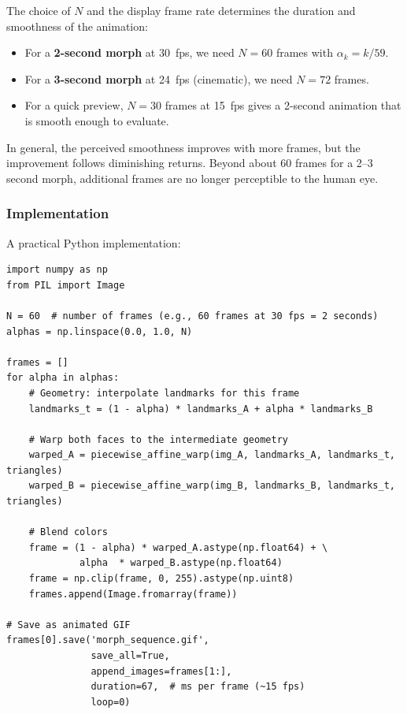 The choice of $N$ and the display frame rate determines the duration and smoothness of the
animation:

\begin{itemize}
    \item For a \textbf{2-second morph} at 30~fps, we need $N = 60$ frames with
          $\alpha_k = k / 59$.
    \item For a \textbf{3-second morph} at 24~fps (cinematic), we need $N = 72$ frames.
    \item For a quick preview, $N = 30$ frames at 15~fps gives a 2-second animation that
          is smooth enough to evaluate.
\end{itemize}

In general, the perceived smoothness improves with more frames, but the improvement follows
diminishing returns. Beyond about 60 frames for a 2--3 second morph, additional frames are no
longer perceptible to the human eye.

\subsubsection{Implementation}

A practical Python implementation:

\begin{verbatim}
import numpy as np
from PIL import Image

N = 60  # number of frames (e.g., 60 frames at 30 fps = 2 seconds)
alphas = np.linspace(0.0, 1.0, N)

frames = []
for alpha in alphas:
    # Geometry: interpolate landmarks for this frame
    landmarks_t = (1 - alpha) * landmarks_A + alpha * landmarks_B

    # Warp both faces to the intermediate geometry
    warped_A = piecewise_affine_warp(img_A, landmarks_A, landmarks_t, triangles)
    warped_B = piecewise_affine_warp(img_B, landmarks_B, landmarks_t, triangles)

    # Blend colors
    frame = (1 - alpha) * warped_A.astype(np.float64) + \
             alpha  * warped_B.astype(np.float64)
    frame = np.clip(frame, 0, 255).astype(np.uint8)
    frames.append(Image.fromarray(frame))

# Save as animated GIF
frames[0].save('morph_sequence.gif',
               save_all=True,
               append_images=frames[1:],
               duration=67,  # ms per frame (~15 fps)
               loop=0)
\end{verbatim}

